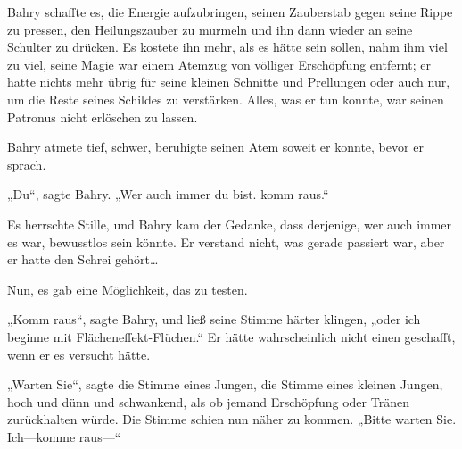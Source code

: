 Bahry schaffte es, die Energie aufzubringen, seinen Zauberstab gegen seine Rippe zu pressen, den Heilungszauber zu murmeln und ihn dann wieder an seine Schulter zu drücken. Es kostete ihn mehr, als es hätte sein sollen, nahm ihm viel zu viel, seine Magie war einem Atemzug von völliger Erschöpfung entfernt; er hatte nichts mehr übrig für seine kleinen Schnitte und Prellungen oder auch nur, um die Reste seines Schildes zu verstärken. Alles, was er tun konnte, war seinen Patronus nicht erlöschen zu lassen.

Bahry atmete tief, schwer, beruhigte seinen Atem soweit er konnte, bevor er sprach.

„Du“, sagte Bahry. „Wer auch immer du bist. komm raus.“

Es herrschte Stille, und Bahry kam der Gedanke, dass derjenige, wer auch immer es war, bewusstlos sein könnte. Er verstand nicht, was gerade passiert war, aber er hatte den Schrei gehört…

Nun, es gab eine Möglichkeit, das zu testen.

„Komm raus“, sagte Bahry, und ließ seine Stimme härter klingen, „oder ich beginne mit Flächeneffekt-Flüchen.“ Er hätte wahrscheinlich nicht einen geschafft, wenn er es versucht hätte.

„Warten Sie“, sagte die Stimme eines Jungen, die Stimme eines kleinen Jungen, hoch und dünn und schwankend, als ob jemand Erschöpfung oder Tränen zurückhalten würde. Die Stimme schien nun näher zu kommen. „Bitte warten Sie. Ich—komme raus—“

